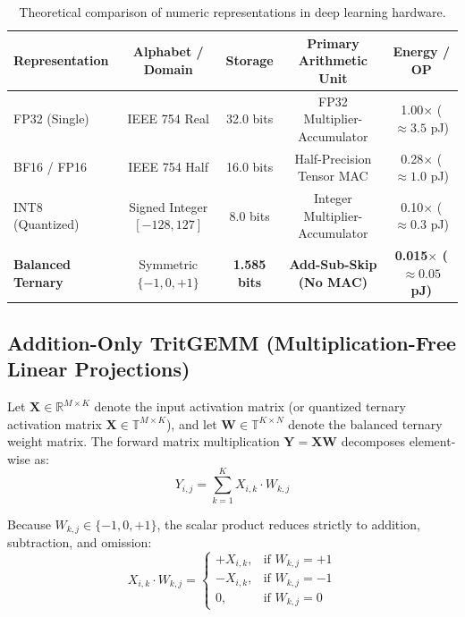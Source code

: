 \documentclass[11pt,a4paper]{article}
\begin{document}
\begin{table}[h]
\centering
\small
\caption{Theoretical comparison of numeric representations in deep learning hardware.}
\vspace{0.4em}
\label{tab:representations}
\begin{tabular}{lcccc}
\toprule
\textbf{Representation} & \textbf{Alphabet / Domain} & \textbf{Storage} & \textbf{Primary Arithmetic Unit} & \textbf{Energy / OP} \\
\midrule
FP32 (Single) & IEEE 754 Real & 32.0 bits & FP32 Multiplier-Accumulator & 1.00$\times$ ($\approx 3.5$ pJ) \\
BF16 / FP16 & IEEE 754 Half & 16.0 bits & Half-Precision Tensor MAC & 0.28$\times$ ($\approx 1.0$ pJ) \\
INT8 (Quantized) & Signed Integer $[-128, 127]$ & 8.0 bits & Integer Multiplier-Accumulator & 0.10$\times$ ($\approx 0.3$ pJ) \\
\textbf{Balanced Ternary} & Symmetric $\{-1, 0, +1\}$ & \textbf{1.585 bits} & \textbf{Add-Sub-Skip (No MAC)} & \textbf{0.015$\times$ ($\approx 0.05$ pJ)} \\
\bottomrule
\end{tabular}
\end{table}

\subsection{Addition-Only TritGEMM (Multiplication-Free Linear Projections)}

Let $\mathbf{X} \in \mathbb{R}^{M \times K}$ denote the input activation matrix (or quantized ternary activation matrix $\mathbf{X} \in \mathbb{T}^{M \times K}$), and let $\mathbf{W} \in \mathbb{T}^{K \times N}$ denote the balanced ternary weight matrix. The forward matrix multiplication $\mathbf{Y} = \mathbf{X} \mathbf{W}$ decomposes element-wise as:
\begin{equation}
Y_{i, j} = \sum_{k=1}^K X_{i, k} \cdot W_{k, j}
\end{equation}

Because $W_{k, j} \in \{-1, 0, +1\}$, the scalar product reduces strictly to addition, subtraction, and omission:
\begin{equation}
X_{i, k} \cdot W_{k, j} = \begin{cases} 
+X_{i, k}, & \text{if } W_{k, j} = +1 \\ 
-X_{i, k}, & \text{if } W_{k, j} = -1 \\ 
0, & \text{if } W_{k, j} = 0 
\end{cases}
\end{equation}
\end{document}
